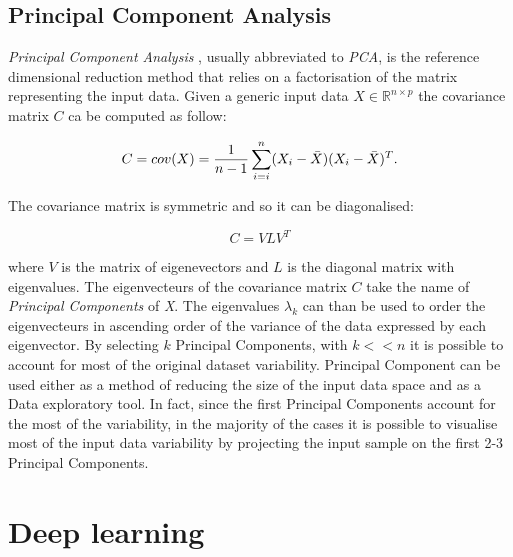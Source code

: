 \subsection{Principal Component Analysis} \label{Principal Component Analysis}

\textit{Principal Component Analysis} \citep{pearson1901liii}\citep{hotelling1933analysis}, usually abbreviated to \textit{PCA}, is the reference dimensional reduction method that relies on a factorisation of the matrix representing the input data. Given a generic input data $X \in \mathbb{R}^{n \times p}$ the covariance matrix $C$ ca be computed as follow:

\begin{equation} \label{eq:covariance}
    C = cov(X) = \frac{1}{n - 1} \sum_{i=i}^{n} (X_{i} - \Bar{X})(X_{i} - \Bar{X})^{T}.
\end{equation}

The covariance matrix is symmetric and so it can be diagonalised:

\begin{equation}
    C = VLV^T
\end{equation}

where $V$ is the matrix of eigenevectors and $L$ is the diagonal matrix with eigenvalues. The eigenvecteurs of the covariance matrix $C$ take the name of \textit{Principal Components} of \textit{X}. The eigenvalues $\lambda_{k}$ can than be used to order the eigenvecteurs in ascending order of the variance of the data expressed by each eigenvector. By selecting $k$ Principal Components, with $k << n$ it is possible to account for most of the original dataset variability. Principal Component can be used either as a method of reducing the size of the input data space and as a Data exploratory tool. In fact, since the first Principal Components account for the most of the variability, in the majority of the cases it is possible to visualise most of the input data variability by projecting the input sample on the first 2-3 Principal Components. 


\section{Deep learning}

